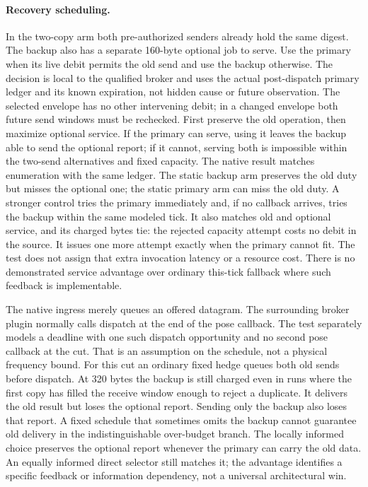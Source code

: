 \documentclass{article}
\begin{document}
\paragraph{Recovery scheduling.}
In the two-copy arm both pre-authorized senders already hold the same
digest. The backup also has a separate 160-byte optional job to serve.
Use the primary when its live debit permits the old send and use the
backup otherwise. The decision is local to the qualified broker and
uses the actual post-dispatch primary ledger and its known expiration,
not hidden cause or future observation. The selected envelope has no
other intervening debit; in a changed envelope both future send
windows must be rechecked. First preserve the old operation, then
maximize optional service. If the primary can serve, using it leaves
the backup able to send the optional report; if it cannot, serving
both is impossible within the two-send alternatives and fixed
capacity. The native result matches enumeration with the same ledger.
The static backup arm preserves the old duty but misses the optional
one; the static primary arm can miss the old duty. A stronger control tries the primary immediately and, if no callback
arrives, tries the backup within the same modeled tick. It also matches
old and optional service, and its charged bytes tie: the rejected
capacity attempt costs no debit in the source. It issues one more
attempt exactly when the primary cannot fit. The test does not assign
that extra invocation latency or a resource cost. There is no
demonstrated service advantage over ordinary this-tick fallback
where such feedback is implementable.

The native ingress merely queues an offered datagram. The surrounding
broker plugin normally calls dispatch at the end of the pose callback.
The test separately models a deadline with one such dispatch
opportunity and no second pose callback at the cut. That is an
assumption on the schedule, not a physical frequency bound. For this
cut an ordinary fixed hedge queues both old sends before dispatch.
At 320 bytes the backup is still charged even in runs where
the first copy has filled the receive window enough to reject a
duplicate. It delivers the old result but loses the optional report.
Sending only the backup also loses that report. A fixed schedule
that sometimes omits the backup cannot guarantee old delivery in
the indistinguishable over-budget branch. The locally informed
choice preserves the optional report whenever the primary can carry
the old data. An equally informed direct selector still matches it;
the advantage identifies a specific feedback or information
dependency, not a universal architectural win.
\end{document}
